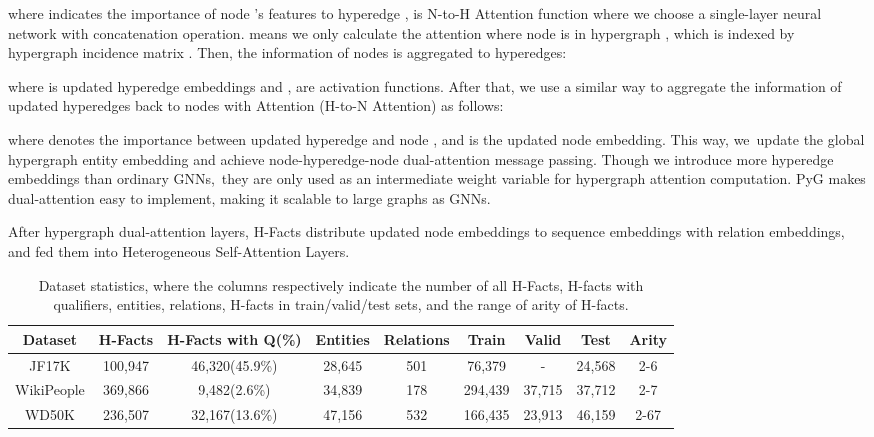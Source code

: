 \documentclass[11pt]{article}
\begin{document}
where  indicates the importance of node ’s features to hyperedge ,  is N-to-H Attention function where we choose a single-layer neural network with concatenation operation.  means we only calculate the attention where node  is in hypergraph , which is indexed by hypergraph incidence matrix . Then, the information of nodes is aggregated to hyperedges:

where  is updated hyperedge embeddings and ,  are activation functions. After that, we use a similar way to aggregate the information of updated hyperedges back to nodes with Attention (H-to-N Attention) as follows:


where  denotes the importance between updated hyperedge  and node , and  is the updated node embedding. This way, we update the global hypergraph entity embedding and achieve node-hyperedge-node dual-attention message passing. Though we introduce more hyperedge embeddings than ordinary GNNs, they are only used as an intermediate weight variable for hypergraph attention computation. PyG makes dual-attention easy to implement, making it scalable to large graphs as GNNs.

After hypergraph dual-attention layers, H-Facts distribute updated node embeddings to sequence embeddings with relation embeddings, and fed them into Heterogeneous Self-Attention Layers.



\begin{table*}
\small
  \centering
    \begin{tabular}{rrrrrrrrr}
    \toprule
    \multicolumn{1}{c}{Dataset} & \multicolumn{1}{c}{H-Facts} & \multicolumn{1}{c}{H-Facts with Q(\%)} & \multicolumn{1}{c}{Entities} & \multicolumn{1}{c}{Relations} & \multicolumn{1}{c}{Train} & \multicolumn{1}{c}{Valid} & \multicolumn{1}{c}{Test} &
    \multicolumn{1}{c}{Arity} \\
    \midrule
    \multicolumn{1}{c}{JF17K} & \multicolumn{1}{c}{100,947} & \multicolumn{1}{c}{46,320(45.9\%)} & \multicolumn{1}{c}{28,645} & \multicolumn{1}{c}{501} & \multicolumn{1}{c}{76,379} & \multicolumn{1}{c}{-} & \multicolumn{1}{c}{24,568} & 
    \multicolumn{1}{c}{2-6} \\
    \multicolumn{1}{c}{WikiPeople} & \multicolumn{1}{c}{369,866} & \multicolumn{1}{c}{9,482(2.6\%)} & \multicolumn{1}{c}{34,839} & \multicolumn{1}{c}{178} & \multicolumn{1}{c}{294,439} & \multicolumn{1}{c}{37,715} & \multicolumn{1}{c}{37,712} & 
    \multicolumn{1}{c}{2-7} \\
    \multicolumn{1}{c}{WD50K} & \multicolumn{1}{c}{236,507} & \multicolumn{1}{c}{32,167(13.6\%)} & \multicolumn{1}{c}{47,156} & \multicolumn{1}{c}{532} & \multicolumn{1}{c}{166,435} & \multicolumn{1}{c}{23,913} & \multicolumn{1}{c}{46,159} & 
    \multicolumn{1}{c}{2-67}\\
    \bottomrule
    \end{tabular}\caption{\label{T}
Dataset statistics, where the columns respectively indicate the number of all H-Facts, H-facts with qualifiers, entities, relations, H-facts in train/valid/test sets, and the range of arity of H-facts.}
\end{table*}
\end{document}
